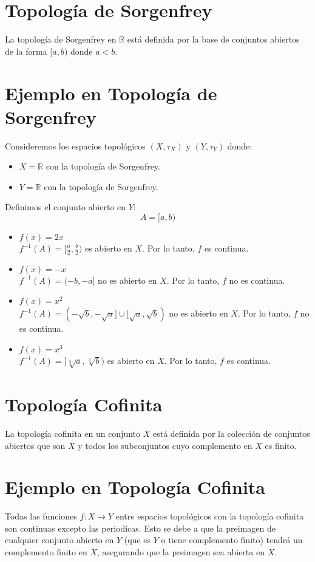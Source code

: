 \documentclass[fleqn]{article}
\begin{document}
    \section*{Topología de Sorgenfrey}
    La topología de Sorgenfrey en \( \mathbb{R} \) está definida por la base de conjuntos abiertos de la forma \( [a, b) \) donde \( a < b \).
    
    \section*{Ejemplo en Topología de Sorgenfrey}
    Consideremos los espacios topológicos \( (X, \tau_X) \) y \( (Y, \tau_Y) \) donde:
    \begin{itemize}
        \item \( X = \mathbb{R} \) con la topología de Sorgenfrey.
        \item \( Y = \mathbb{R} \) con la topología de Sorgenfrey.
    \end{itemize}
    Definimos el conjunto abierto en \( Y \):
    \[ A = [a, b) \]
    \begin{itemize}
        \item \(f(x) = 2x\) \\
        \(f^{-1}(A) = [\frac{a}{2}, \frac{b}{2})\) es abierto en \( X \). Por lo tanto, \( f \) es continua.
        \item \(f(x) = -x\) \\
        \(f^{-1}(A) = (-b, -a]\) no es abierto en \( X \). Por lo tanto, \( f \) no es continua.
        \item \(f(x) = x^2\) \\
        \(f^{-1}(A) = (-\sqrt{b}, -\sqrt{a}] \cup [\sqrt{a}, \sqrt{b})\) no es abierto en \( X \). Por lo tanto, \( f \) no es continua.
        \item \(f(x) = x^3\) \\
        \(f^{-1}(A) = [\sqrt[3]{a}, \sqrt[3]{b})\) es abierto en \( X \). Por lo tanto, \( f \) es continua.
    \end{itemize}

    \section*{Topología Cofinita}
    La topología cofinita en un conjunto \( X \) está definida por la colección de conjuntos abiertos que son \( X \) y todos los subconjuntos cuyo complemento en \( X \) es finito.

    \section*{Ejemplo en Topología Cofinita}
    Todas las funciones \( f: X \to Y \) entre espacios topológicos con la topología cofinita son continuas excepto las periodicas. Esto se debe a que la preimagen de cualquier conjunto abierto en \( Y \) (que es \( Y \) o tiene complemento finito) tendrá un complemento finito en \( X \), asegurando que la preimagen sea abierta en \( X \).
\end{document}
